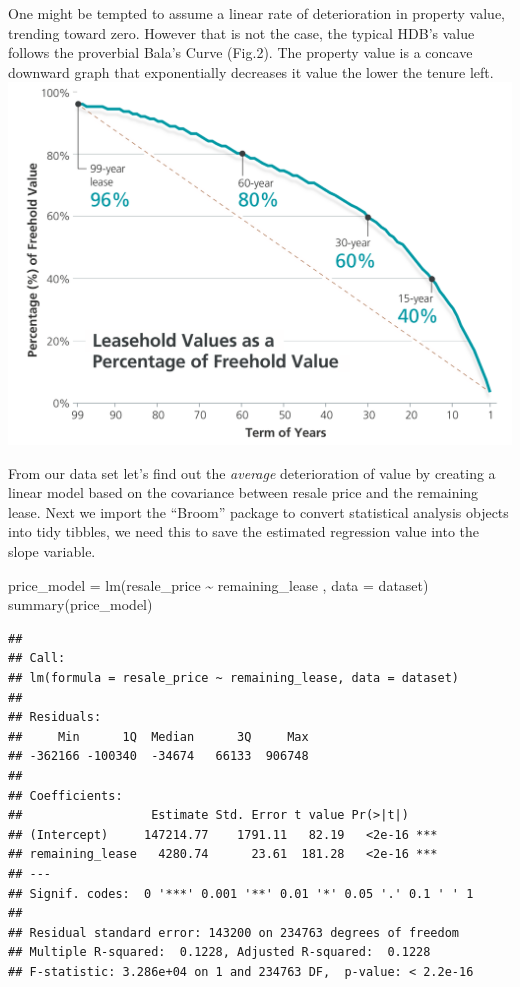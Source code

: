 \documentclass[
]{article}
\newenvironment{Shaded}{\begin{snugshade}}{\end{snugshade}}
\newcommand{\AttributeTok}[1]{\textcolor[rgb]{0.77,0.63,0.00}{#1}}
\newcommand{\FunctionTok}[1]{\textcolor[rgb]{0.00,0.00,0.00}{#1}}
\newcommand{\NormalTok}[1]{#1}
\newcommand{\OtherTok}[1]{\textcolor[rgb]{0.56,0.35,0.01}{#1}}
\newcommand{\SpecialCharTok}[1]{\textcolor[rgb]{0.00,0.00,0.00}{#1}}
\begin{document}
One might be tempted to assume a linear rate of deterioration in
property value, trending toward zero. However that is not the case, the
typical HDB's value follows the proverbial Bala's Curve (Fig.2). The
property value is a concave downward graph that exponentially decreases
it value the lower the tenure left.
\includegraphics{images/Bala-curve.png}

From our data set let's find out the \emph{average} deterioration of
value by creating a linear model based on the covariance between resale
price and the remaining lease. Next we import the ``Broom'' package to
convert statistical analysis objects into tidy tibbles, we need this to
save the estimated regression value into the slope variable.

\begin{Shaded}
\begin{Highlighting}[]
\NormalTok{price\_model }\OtherTok{=} \FunctionTok{lm}\NormalTok{(resale\_price }\SpecialCharTok{\textasciitilde{}}\NormalTok{ remaining\_lease , }\AttributeTok{data =}\NormalTok{ dataset)}
\FunctionTok{summary}\NormalTok{(price\_model)}
\end{Highlighting}
\end{Shaded}

\begin{verbatim}
## 
## Call:
## lm(formula = resale_price ~ remaining_lease, data = dataset)
## 
## Residuals:
##     Min      1Q  Median      3Q     Max 
## -362166 -100340  -34674   66133  906748 
## 
## Coefficients:
##                  Estimate Std. Error t value Pr(>|t|)    
## (Intercept)     147214.77    1791.11   82.19   <2e-16 ***
## remaining_lease   4280.74      23.61  181.28   <2e-16 ***
## ---
## Signif. codes:  0 '***' 0.001 '**' 0.01 '*' 0.05 '.' 0.1 ' ' 1
## 
## Residual standard error: 143200 on 234763 degrees of freedom
## Multiple R-squared:  0.1228, Adjusted R-squared:  0.1228 
## F-statistic: 3.286e+04 on 1 and 234763 DF,  p-value: < 2.2e-16
\end{verbatim}
\end{document}
